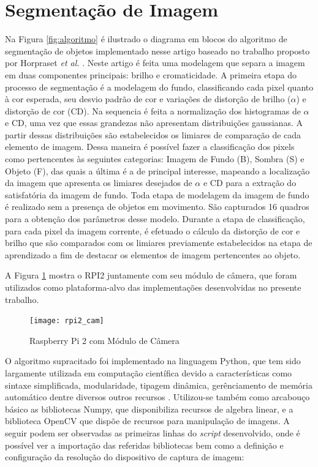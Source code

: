 \documentclass[conference]{IEEEtran}
\begin{document}
\section{Segmentação de Imagem}
Na Figura \ref{fig:algoritmo} é ilustrado o diagrama em blocos do algoritmo de segmentação de objetos implementado nesse artigo baseado no trabalho proposto por Horpraset \textit{et al.} \cite{IEEEhowto:horprasert}.  Neste artigo é feita uma modelagem que separa a imagem em duas componentes principais: brilho e cromaticidade. A primeira etapa do processo de segmentação é a modelagem do fundo, classificando cada pixel quanto à cor esperada, seu desvio padrão de cor e variações de distorção de brilho (\(\alpha\)) e distorção de cor (CD). Na sequencia é feita a normalização dos histogramas de \(\alpha\) e CD, uma vez que essas grandezas não apresentam distribuições gaussianas. A partir dessas distribuições são estabelecidos os limiares de comparação de cada elemento de imagem. Dessa maneira é possível fazer a classificação dos pixels como pertencentes às seguintes categorias: Imagem de Fundo (B), Sombra (S) e Objeto (F), das quais a última é a de principal interesse, mapeando a localização da imagem que apresenta os limiares desejados de \(\alpha\) e CD para a extração do satisfatória da imagem de fundo. Toda etapa de modelagem da imagem de fundo é realizado sem a presença de objetos em movimento. São capturados 16 quadros para a obtenção dos parâmetros desse modelo. Durante a etapa de classificação, para cada pixel da imagem corrente, é efetuado o cálculo da distorção de cor e brilho que são comparados com os limiares previamente estabelecidos na etapa de aprendizado a fim de destacar os elementos de imagem pertencentes ao objeto.

A Figura \ref{fig:rpi2_cam} mostra o RPI2 juntamente com seu módulo de câmera, que foram utilizados como plataforma-alvo das implementações desenvolvidas no presente trabalho.

\begin{figure}[!t]
\centering
\texttt{[image: rpi2\_cam]}
\caption{Raspberry Pi 2 com Módulo de Câmera}
\label{fig:rpi2_cam}
\end{figure}

O algoritmo supracitado foi implementado na linguagem Python, que tem sido largamente utilizada em computação científica devido a características como sintaxe simplificada, modularidade, tipagem dinâmica, gerênciamento de memória automático dentre diversos outros recursos \cite{IEEEhowto:fangohr}. Utilizou-se também como arcabouço básico as bibliotecas Numpy, que disponibiliza recursos de algebra linear, e a biblioteca OpenCV que dispõe de recursos para manipulação de imagens. A seguir podem ser observadas as primeiras linhas do \textit{script} desenvolvido, onde é possível ver a importação das referidas bibliotecas bem como a definição e configuração da resolução do dispositivo de captura de imagem:
\end{document}
